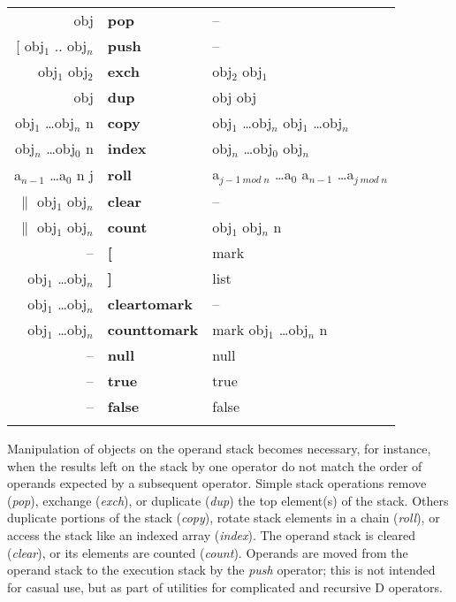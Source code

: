 \begin{tabular}{>{\sffamily}r>{\sffamily\bfseries}l>{\sffamily}l}
obj & pop & --\\
\relax[ obj$_1$ .. obj$_n$ & push & -- \\ %
obj$_1$ obj$_2$ & exch & obj$_2$ obj$_1$\\ 
obj & dup & obj obj\\ 
obj$_1$ \ldots obj$_n$ n & copy & obj$_1$ \ldots obj$_n$ obj$_1$ \ldots obj$_n$\\
obj$_n$ \ldots obj$_0$ n & index & obj$_n$ \ldots obj$_0$ obj$_n$\\
a$_{n-1}$ \ldots a$_0$ n j & roll & a$_{j-1 \ mod \ n}$ \ldots a$_0$ a$_{n-1}$ \ldots a$_{j \ mod \ n}$\\
$\|$ obj$_1$ obj$_n$ & clear & --\\
$\|$ obj$_1$ obj$_n$ & count & obj$_1$ obj$_n$ n\\ 
-- & [ & mark\\
obj$_1$ \ldots obj$_n$ & ] & list\\
obj$_1$ \ldots obj$_n$ & cleartomark & --\\
obj$_1$ \ldots obj$_n$ & counttomark &  mark obj$_1$ \ldots obj$_n$ n\\
-- & null & null\\
-- & true & true\\
-- & false & false\\\\
\end{tabular}

\index{Operators![}
\index{Operators!]}
 

Manipulation of objects on the operand stack becomes necessary,  for  instance, when  the  results  left on the stack by one operator  do  not  match  the 
order of operands expected by a subsequent operator.  Simple  stack  operations remove (\emph{pop}),  exchange (\emph{exch}), or duplicate (\emph{dup}) the top element(s) of the stack.  Others  duplicate  portions  of the  stack  (\emph{copy}),  rotate  stack elements  in a chain (\emph{roll}),  or access the stack like an indexed  array (\emph{index}). The operand stack is cleared (\emph{clear}), or its elements are counted (\emph{count}). Operands are moved from the operand stack to the execution stack by the \emph{push} operator; this is not intended for casual use, but as part of utilities for complicated and recursive D operators.

